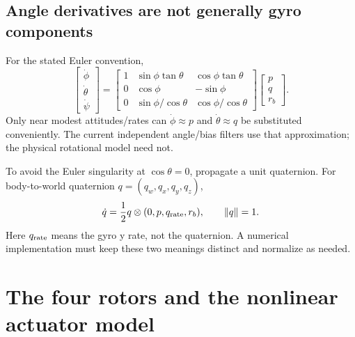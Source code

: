 \section{Angle derivatives are not generally gyro components}
For the stated Euler convention,
\begin{equation}
\begin{bmatrix}\dot\phi\\\dot\theta\\\dot\psi\end{bmatrix}=
\begin{bmatrix}
1&\sin\phi\tan\theta&\cos\phi\tan\theta\\
0&\cos\phi&-\sin\phi\\
0&\sin\phi/\cos\theta&\cos\phi/\cos\theta
\end{bmatrix}
\begin{bmatrix}p\\q\\r_b\end{bmatrix}.
\end{equation}
Only near modest attitudes/rates can $\dot\phi\approx p$ and $\dot\theta\approx q$
be substituted conveniently. The current independent angle/bias filters use that
approximation; the physical rotational model need not.

To avoid the Euler singularity at $\cos\theta=0$, propagate a unit quaternion.
For body-to-world quaternion $q=(q_w,q_x,q_y,q_z)$,
\begin{equation}
\dot q=\frac12 q\otimes(0,p,q_{\rm rate},r_b),\qquad \|q\|=1.
\end{equation}
Here $q_{\rm rate}$ means the gyro y rate, not the quaternion. A numerical
implementation must keep these two meanings distinct and normalize as needed.

\chapter{The four rotors and the nonlinear actuator model}
